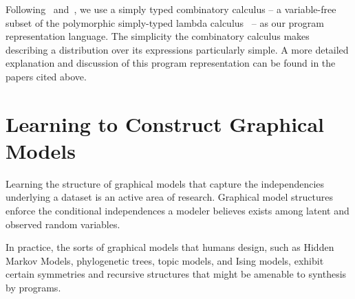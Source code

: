 \documentclass{article} %
\begin{document}
Following~\citet{DBLP:conf/ijcai/DechterMAT13} and~\citet{DBLP:conf/icml/LiangJK10}, we use a
simply typed combinatory calculus -- a variable-free subset of the
polymorphic simply-typed lambda calculus~\citep{DBLP:books/daglib/0005958} -- as our
program representation language. The simplicity the combinatory calculus makes describing a distribution over its expressions particularly simple. A more detailed explanation and discussion of this program representation can be found in the papers cited above. 

\section{Learning to Construct Graphical Models}

Learning the structure of graphical models that capture the independencies underlying a dataset is an active area of research\cite{adams-wallach-ghahramani-2010a}\cite{ISI:000240797500002}\cite{ISI:000178037200004}\cite{DBLP:journals/corr/abs-1302-6815}. Graphical model structures enforce the conditional independences a modeler believes exists among latent and observed random variables\cite{DBLP:books/daglib/0066829}.

In practice, the sorts of graphical models that humans design, such as Hidden Markov Models, phylogenetic trees, topic models, and Ising models, exhibit certain symmetries and recursive structures that might be amenable to synthesis by programs.
\end{document}

